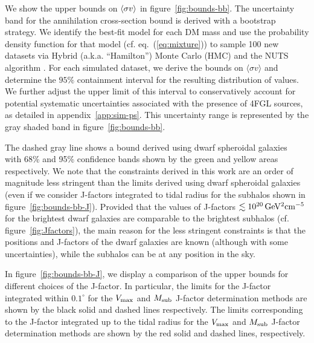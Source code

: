 We show the upper bounds on $\langle \sigma v \rangle$ in figure~\ref{fig:bounds-bb}.
The uncertainty band for the annihilation cross-section bound {is derived with} a bootstrap strategy. 
We identify the best-fit model for each DM mass and  use the probability density function for that model (cf. eq.~(\ref{eq:mixture})) to sample 100 new datasets via Hybrid (a.k.a. ``Hamilton'') Monte Carlo (HMC) \cite{2017arXiv170102434B} and the NUTS algorithm \cite{2011arXiv1111.4246H}. 
{For each simulated dataset, we derive the bounds on $\langle \sigma v \rangle$ and determine the $95\%$ containment interval for the resulting distribution of values. We further adjust the upper limit of this interval to conservatively account for potential systematic uncertainties associated with the presence of 4FGL sources, as detailed in appendix~\ref{app:sim-ps}. This uncertainty range is represented by the gray shaded band in figure~\ref{fig:bounds-bb}.}



{The dashed gray line shows} a bound derived using dwarf spheroidal galaxies~\cite{2024PhRvD.109f3024M} with 68\% and 95\% confidence bands {shown by the green and yellow areas respectively.}
We note that the constraints derived in this work are an order of magnitude less stringent than the limits derived using dwarf spheroidal galaxies (even if we consider J-factors integrated to tidal radius for the subhalos shown in figure~\ref{fig:bounds-bb-J}).
Provided that the values of J-factors $\lesssim 10^{20}\, {\rm GeV^2 cm^{-5}} $ for the brightest dwarf galaxies \citep{2024PhRvD.109f3024M} are comparable to the brightest subhalos (cf. figure~\ref{fig:Jfactors}), the main reason for the less stringent constraints is that the positions and J-factors of the dwarf galaxies are known (although with some uncertainties), while the subhalos can be at any position in the sky.

In figure~\ref{fig:bounds-bb-J}, we display a comparison of the upper bounds for different choices of the J-factor.
In particular, the limits for the J-factor integrated within $0.1^\circ$ for the $V_{\rm max}$ and $M_{\rm sub}$ J-factor
determination methods are shown by the black solid and dashed lines respectively. 
The limits corresponding to the J-factor integrated up to the tidal radius for 
the $V_{\rm max}$ and $M_{\rm sub}$ J-factor determination methods are shown by the red solid and dashed lines, respectively.


